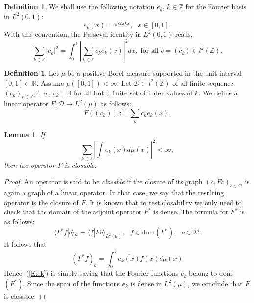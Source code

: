 \documentclass{birkmult}
\newtheorem{lem}[thm]{Lemma}
\theoremstyle{definition}
\newtheorem{defn}[thm]{Definition}
\theoremstyle{remark}
\numberwithin{equation}{section}
\begin{document}
\begin{defn}
\label{D:2.3}
We shall use the following notation $e_{k}$, $k \in \mathbb{Z}$ for the Fourier
basis in $L^{2}(0,1)$:
\[
  e_{k}(x) = e^{i2\pi kx}, \text{  } x \in [0,1].
\]
With this convention, the Parseval identity in $L^{2}(0,1)$ reads, 
\begin{equation}
\label{E:ckl}
  \sum_{k \in \mathbb{Z}} |c_{k}|^{2} 
  = \int_{0}^{1}\left\vert \sum_{k \in \mathbb{Z}}c_{k}e_{k}(x)\right\vert^{2}dx, \text{ for all }
  c=(c_{k}) \in l^{2}(\mathbb{Z}).
\end{equation}
\end{defn}

\begin{defn}
\label{D:2.4}
Let $\mu$ be a positive Borel measure supported in the unit-interval 
$[0,1] \subset \mathbb{R}$.  Assume $\mu([0,1])< \infty$.  Let 
$\mathcal{D} \subset l^{2}(\mathbb{Z})$ of all finite sequence 
$(c_{k})_{k \in \mathbb{Z}}$; i. e., $c_{k} = 0$ for all but a finite set
of index values of $k$.  We define a linear operator 
$F: \mathcal{D} \to L^{2}(\mu)$ as follows: 
\begin{equation}
\label{E:Fck}
  F((c_{k})):= \sum_{k}c_{k}e_{k}(x).
\end{equation}
\end{defn}

\begin{lem}
\label{L:2.5}
If 
\begin{equation}
\label{E:ek}
  \sum_{k \in \mathbb{Z}}\left\vert \int e_{k}(x)d\mu (x)\right\vert^{2} < \infty,
\end{equation} 
then the operator $F$ is closable.
\end{lem}
\begin{proof}
An operator is said to be \textit{closable} if the closure of its graph 
$(c, Fc)_{c \in \mathcal{D}}$ is again a graph of a linear operator.  In 
that case, we say that the resulting operator is the closure of $F$.  It 
is known that to test closability we only need to check that the domain of 
the adjoint operator $F^{*}$ is dense.  The formula for $F^{*}$ is as follows:
\[
  \langle F^{*}f | c \rangle_{l^{2}} = \langle f | Fc \rangle_{L^{2}(\mu)}, 
  \text{  } f \in \text{dom}(F^{*}), \text{  } c \in \mathcal{D}.
\]
It follows that 
\[
  (F^{*}f)_{k} = \int_{0}^{1}\overline{e_{k}(x)}f(x)d\mu (x)
\]
Hence, (\ref{E:ek})
is simply saying that the Fourier functions $e_{k}$ belong to dom$(F^{*})$.
Since the span of the functions $e_{k}$ is dense in $L^{2}(\mu)$, we 
conclude that $F$ is closable.
\end{proof}
\end{document}
